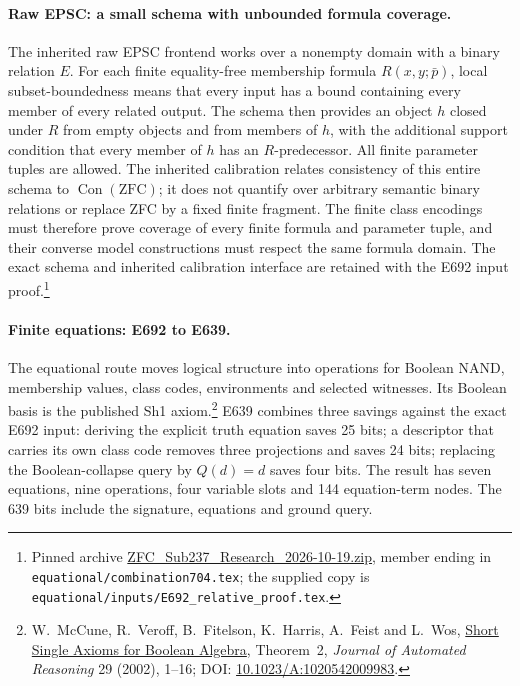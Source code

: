 \paragraph{Raw EPSC: a small schema with unbounded formula coverage.}
The inherited raw EPSC frontend works over a nonempty domain with a binary
relation $E$.  For each finite equality-free membership formula
$R(x,y;\bar p)$, local subset-boundedness means that every input has a
bound containing every member of every related output.  The schema then
provides an object $h$ closed under $R$ from empty objects and from members
of $h$, with the additional support condition that every member of $h$ has
an $R$-predecessor.  All finite parameter tuples are allowed.  The inherited
calibration relates consistency of this entire schema to
$\operatorname{Con}(\mathrm{ZFC})$; it does not quantify over arbitrary
semantic binary relations or replace ZFC by a fixed finite fragment.
The finite class encodings must therefore prove coverage of every finite
formula and parameter tuple, and their converse model constructions must
respect the same formula domain.  The exact schema and inherited
calibration interface are retained with the E692 input proof.\footnote{
Pinned archive
\href{https://github.com/VladimirReshetnikov/ProveIt/blob/1b27f052d770f4c7d435e82e779bf21f5a1f66ed/docs/incoming/ZFC_Sub237_Research_2026-10-19.zip}{ZFC\_Sub237\_Research\_2026-10-19.zip},
member ending in \texttt{equational/combination704.tex}; the supplied copy is
\texttt{equational/inputs/E692\_relative\_proof.tex}.}

\paragraph{Finite equations: E692 to E639.}
The equational route moves logical structure into operations for Boolean
NAND, membership values, class codes, environments and selected witnesses.
Its Boolean basis is the published Sh1 axiom.\footnote{W.~McCune,
R.~Veroff, B.~Fitelson, K.~Harris, A.~Feist and L.~Wos,
\href{https://www.cs.unm.edu/~mccune/papers/basax/v12.pdf}{Short Single
Axioms for Boolean Algebra}, Theorem~2, \emph{Journal of Automated
Reasoning} 29 (2002), 1--16; DOI:
\href{https://doi.org/10.1023/A:1020542009983}{10.1023/A:1020542009983}.}
E639 combines three savings against the exact E692 input: deriving the
explicit truth equation saves 25 bits; a descriptor that carries its own
class code removes three projections and saves 24 bits; replacing the
Boolean-collapse query by $Q(d)=d$ saves four bits.  The result has seven
equations, nine operations, four variable slots and 144 equation-term
nodes.  The 639 bits include the signature, equations and ground query.

